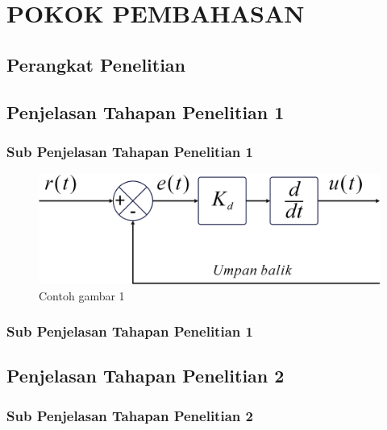 \chapter[POKOK PEMBAHASAN]{\\ POKOK PEMBAHASAN}
\lipsum[1]

\section{Perangkat Penelitian}
\lipsum[1]

\section{Penjelasan Tahapan Penelitian 1}
\lipsum[1]

\subsection{Sub Penjelasan Tahapan Penelitian 1}
\lipsum[1]

\begin{figure}[H]
    \centering
    \includegraphics[width=0.8\linewidth]{gambar/diagram.png}
    \caption{Contoh gambar 1}
    \label{gambar1}
\end{figure}

\lipsum[1]

\subsection{Sub Penjelasan Tahapan Penelitian 1}
\lipsum[1]

\section{Penjelasan Tahapan Penelitian 2}
\lipsum[1]

\subsection{Sub Penjelasan Tahapan Penelitian 2}
\lipsum[1]

